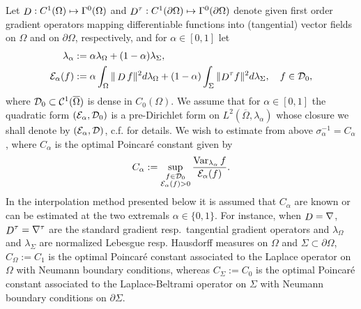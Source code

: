 \documentclass[a4paper]{article}
\theoremstyle{definition}
\DeclareMathOperator{\Var}{Var}
\numberwithin{equation}{section}
\begin{document}
Let $\mathop D: C^1(\Omega) \mapsto \Gamma^0(\Omega)$ and ${\mathop D}^\tau: C^1(\partial \Omega) \mapsto \Gamma^0(\partial \Omega)$ denote given first order gradient operators mapping differentiable functions into (tangential) vector fields  on $\Omega$ and  on $\partial \Omega$, respectively, and for $\alpha \in [0,1]$ let \begin{align*}
\lambda_\alpha&:= \alpha \lambda_\Omega + (1-\alpha) \lambda_\Sigma, \\
\mathcal E_\alpha (f) &:= \alpha \int_\Omega \| \mathop D f \|^2 d\lambda_\Omega+ (1-\alpha)  \int_{\Sigma} \| {\mathop D}^\tau f \|^2 d\lambda_\Sigma, \quad  f \in \mathcal {D}_0,
\end{align*}
where $\mathcal {D}_0 \subset   \mathcal{C}^1(\overline \Omega)$ is  dense in $C_0(\Omega)$. We assume that  for $\alpha \in [0,1]$ the quadratic form $(\mathcal E_\alpha,\mathcal {D}_0)$ is a pre-Dirichlet form on $L^2(\overline \Omega,\lambda_\alpha)$ whose closure we shall denote by $(\mathcal E_\alpha,\mathcal {D})$, c.f. \cite{grothaus} for details. We wish to estimate from above $\sigma_\alpha^{-1}=C_\alpha$, where $C_\alpha$ is the optimal Poincaré constant given by
\begin{equation} %
  \label{equ_constant_c_alpha}
  C_\alpha:= \sup_{\substack {f \in \DomE_0 \\ \mathcal E_\alpha(f)>0}}  \frac{\Var_{\lambda_\alpha} f}{\mathcal E_\alpha (f)} .
\end{equation}
In the interpolation method presented below  it is assumed that $C_\alpha$ are known or can be estimated at the two extremals  $\alpha\in \{0,1\}$. For instance, when $\mathop D= \nabla$, ${\mathop D}^\tau = \nabla^\tau$ are the standard gradient resp.\ tangential gradient operators and $\lambda_\Omega$ and $\lambda_\Sigma$ are normalized Lebesgue resp. Hausdorff measures on $\Omega$ and $\Sigma \subset \partial \Omega$,   $C_\Omega:=C_1$ is the optimal Poincaré constant associated to the Laplace operator on $\Omega$ with Neumann boundary conditions, 
whereas  $C_\Sigma:=C_0$ is  the optimal Poincaré constant associated to the Laplace-Beltrami operator on $\Sigma$ with Neumann boundary conditions on $\partial\Sigma$. 

\smallskip 
\end{document}
